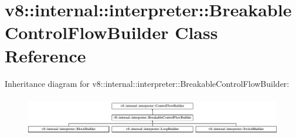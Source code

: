 \hypertarget{classv8_1_1internal_1_1interpreter_1_1BreakableControlFlowBuilder}{}\section{v8\+:\+:internal\+:\+:interpreter\+:\+:Breakable\+Control\+Flow\+Builder Class Reference}
\label{classv8_1_1internal_1_1interpreter_1_1BreakableControlFlowBuilder}
Inheritance diagram for v8\+:\+:internal\+:\+:interpreter\+:\+:Breakable\+Control\+Flow\+Builder\+:\begin{figure}[H]
\begin{center}
\leavevmode
\includegraphics[height=1.761006cm]{classv8_1_1internal_1_1interpreter_1_1BreakableControlFlowBuilder}
\end{center}
\end{figure}
